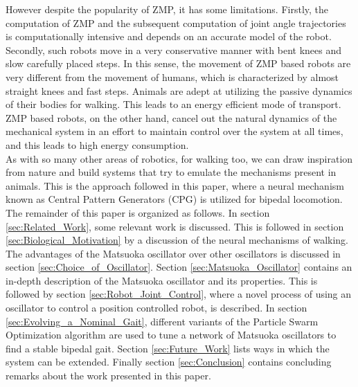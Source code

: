 \documentclass[12pt,twoside]{article}
\theoremstyle{plain}
\theoremstyle{definition}
\theoremstyle{remark}
\newcommand{\forceindent}{\leavevmode{\parindent=2em\indent}}
\begin{document}
\forceindent However despite the popularity of ZMP, it has some limitations. Firstly, the computation of ZMP and the subsequent computation of joint angle trajectories is computationally intensive and depends on an accurate model of the robot. Secondly, such robots move in a very conservative manner with bent knees and slow carefully placed steps. In this sense, the movement of ZMP based robots are very different from the movement of humans, which is characterized by almost straight knees and fast steps. Animals are adept at utilizing the passive dynamics of their bodies for walking. This leads to an energy efficient mode of transport. ZMP based robots, on the other hand, cancel out the natural dynamics of the mechanical system in an effort to maintain control over the system at all times, and this leads to high energy consumption.\\
\forceindent As with so many other areas of robotics, for walking too, we can draw inspiration from nature and build systems that try to emulate the mechanisms present in animals. This is the approach followed in this paper, where a neural mechanism known as Central Pattern Generators (CPG) is utilized for  bipedal locomotion. The remainder of this paper is organized as follows. In section \ref{sec:Related_Work}, some relevant work is discussed. This is followed in section \ref{sec:Biological_Motivation} by a discussion of the neural mechanisms of walking. The advantages of the Matsuoka oscillator over other oscillators is discussed in section \ref{sec:Choice_of_Oscillator}.  Section \ref{sec:Matsuoka_Oscillator} contains an in-depth description of the Matsuoka oscillator and its properties. This is followed by section \ref{sec:Robot_Joint_Control}, where a novel process of using an oscillator to control a position controlled robot, is described. In section \ref{sec:Evolving_a_Nominal_Gait}, different variants of the Particle Swarm Optimization algorithm are used to tune a network of Matsuoka oscillators to find a stable bipedal gait. Section \ref{sec:Future_Work} lists ways in which the system can be extended. Finally section \ref{sec:Conclusion} contains concluding remarks about the work presented in this paper.
\end{document}
